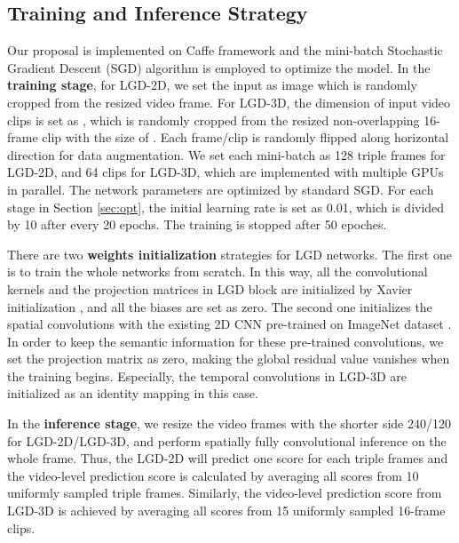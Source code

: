 \documentclass[10pt,twocolumn,letterpaper]{article}
\begin{document}
\subsection{Training and Inference Strategy}
Our proposal is implemented on Caffe \cite{jia2014caffe} framework and the mini-batch Stochastic Gradient Descent (SGD) algorithm is employed to optimize the model. In the \textbf{training stage}, for LGD-2D, we set the input as  image which is randomly cropped from the resized  video frame. For LGD-3D, the dimension of input video clips is set as , which is randomly cropped from the resized non-overlapping 16-frame clip with the size of . Each frame/clip is randomly flipped along horizontal direction for data augmentation. We set each mini-batch as 128 triple frames for LGD-2D, and 64 clips for LGD-3D, which are implemented with multiple GPUs in parallel. The network parameters are optimized by standard SGD. For each stage in Section \ref{sec:opt}, the initial learning rate is set as 0.01, which is divided by 10 after every 20 epochs. The training is stopped after 50 epoches.

There are two \textbf{weights initialization} strategies for LGD networks. The first one is to train the whole networks from scratch. In this way, all the convolutional kernels and the projection matrices  in LGD block are initialized by Xavier initialization \cite{glorot2010understanding}, and all the biases are set as zero. The second one initializes the spatial convolutions with the existing 2D CNN pre-trained on ImageNet dataset \cite{russakovsky2015imagenet}. In order to keep the semantic information for these pre-trained convolutions, we set the projection matrix  as zero, making the global residual value vanishes when the training begins. Especially, the temporal convolutions in LGD-3D are initialized as an identity mapping in this case.

In the \textbf{inference stage}, we resize the video frames with the shorter side 240/120 for LGD-2D/LGD-3D, and perform spatially fully convolutional inference on the whole frame. Thus, the LGD-2D will predict one score for each triple frames and the video-level prediction score is calculated by averaging all scores from 10 uniformly sampled triple frames. Similarly, the video-level prediction score from LGD-3D is achieved by averaging all scores from 15 uniformly sampled 16-frame clips.
\end{document}
